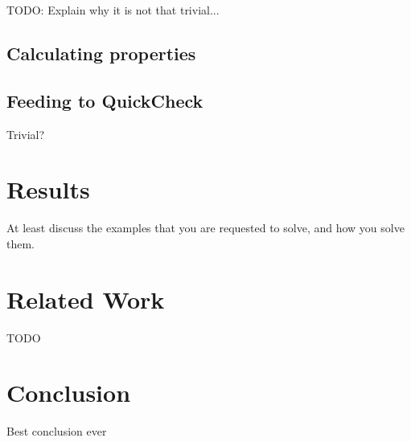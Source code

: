 \documentclass[a4paper]{article}
\begin{document}
TODO: Explain why it is not that trivial...

\subsection{Calculating properties}

\subsection{Feeding to QuickCheck}

Trivial?

\section{Results}

At least discuss the examples that you are requested
to solve, and how you solve them.

\section{Related Work}

TODO

\section{Conclusion}

Best conclusion ever



\end{document}
